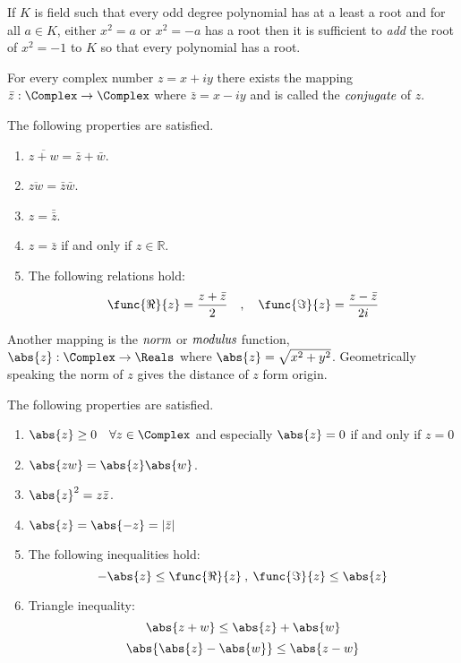 \begin{theorem}
      If \(K\) is field such that every odd degree polynomial has at a least a root and for all \(a \in K\), either \(x^2 = a\) or \(x^2 = -a\) has a root then it is sufficient to \textit{add} the root of \(x^2 = -1\) to \(K\) so that every polynomial has a root.
\end{theorem}

For every complex number \(z = x + iy\) there exists the mapping \(\bar{z}: \Complex \to \Complex\) where \(\bar{z} = x - iy\) and is called the \(\emph{conjugate}\) of \(z\).
\begin{proposition}
        The following properties are satisfied.
        \begin{enumerate}
                \item \(\overline{z + w} = \bar{z} + \bar{w}\).
                \item \(\overline{zw} = \bar{z}\bar{w}\).
                \item \(z = \bar{\bar{z}}\).
                \item \(z = \bar{z}\) if and only if \(z \in \mathbb{R}\).
                \item The following relations hold:
                      \[ \func{\Re}{z} = \dfrac{z + \bar{z}}{2} \quad,\quad \func{\Im}{z} = \dfrac{z - \bar{z}}{2i}\]
        \end{enumerate}
\end{proposition}
Another mapping is the \(\emph{norm}\) or \(\emph{modulus}\) function, \(\abs{z}: \Complex \to \Reals \) where \(\abs{z} = \sqrt{x^2 + y^2}\). Geometrically speaking the norm of \(z\) gives the distance of \(z\) form origin.
\begin{proposition}
        The following properties are satisfied.
        \begin{enumerate}
                \item \(\abs{z} \geq 0 \quad \forall z \in \Complex\) and especially \(\abs{z} = 0\) if and only if \(z = 0\)
                \item \(\abs{zw} = \abs{z}\abs{w}\).
                \item \(\abs{z}^2 = z\bar{z}\).
                \item \(\abs{z} = \abs{-z} = |\bar{z}|\)
                \item The following inequalities hold:
                      \[ -\abs{z} \leq \func{\Re}{z} \:,\: \func{\Im}{z} \leq \abs{z}\]
                \item Triangle inequality:
                      \[ \abs{z + w} \leq \abs{z} + \abs{w} \]
                      \[ \abs{\abs{z} - \abs{w}} \leq \abs{z- w}\]
        \end{enumerate}
\end{proposition}

